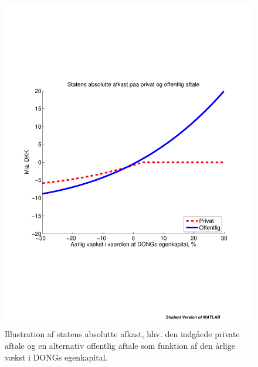 \documentclass{article}
\begin{document}
\begin{figure}
\includegraphics[scale=0.8]{../matlab/figs/private_public_deal}
\caption{Illustration af statens absolutte afkast, hhv. den indg\aa{}ede private aftale og en alternativ offentlig aftale som funktion af den \aa{}rlige v\ae{}kst i DONGs egenkapital. }
\label{fig:privat_off}
\end{figure}

\end{document}
